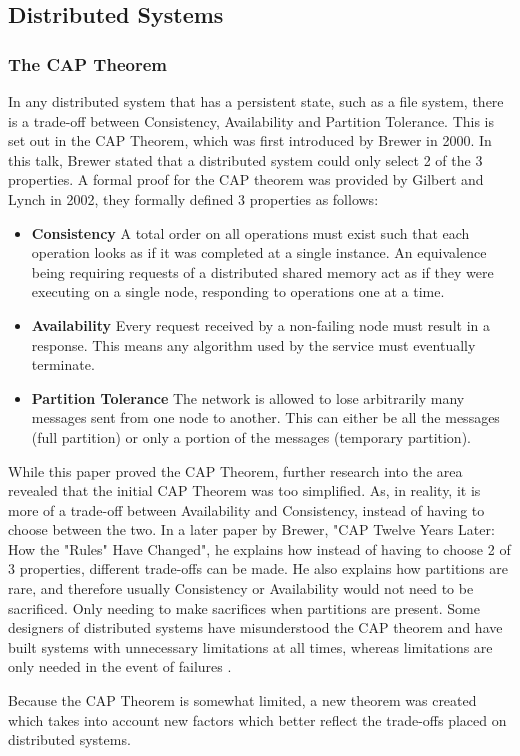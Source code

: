 \documentclass[12pt]{article}
\begin{document}
\subsection{Distributed Systems}
\subsubsection{The CAP Theorem}
In any distributed system that has a persistent state, such as a file system, there is a trade-off between Consistency, Availability and Partition Tolerance.
This is set out in the CAP Theorem, which was first introduced by Brewer in 2000\cite{CAPTheorem}. In this talk, Brewer stated that a distributed system could only select 2 of the 3 properties. A formal proof for the CAP theorem was provided by Gilbert and Lynch in 2002\cite{10.1145/564585.564601}, they formally defined 3 properties as follows:
\begin{itemize}
    \item \textbf{Consistency} A total order on all operations must exist such that each operation looks as if it was completed at a single instance. An equivalence being requiring requests of a distributed shared memory act as if they were executing on a single node, responding to operations one at a time.
    \item \textbf{Availability} Every request received by a non-failing node must result in a response.  This means any algorithm used by the service must eventually terminate.
    \item \textbf{Partition Tolerance} The network is allowed to lose arbitrarily many messages sent from one node to another. This can either be all the messages (full partition) or only a portion of the messages (temporary partition).
\end{itemize}
While this paper proved the CAP Theorem, further research into the area revealed that the initial CAP Theorem was too simplified. As, in reality, it is more of a trade-off between Availability and Consistency, instead of having to choose between the two. In a later paper by Brewer, "CAP Twelve Years Later: How the "Rules" Have Changed"\cite{6133253}, he explains how instead of having to choose 2 of 3 properties, different trade-offs can be made. He also explains how partitions are rare, and therefore usually Consistency or Availability would not need to be sacrificed. Only needing to make sacrifices when partitions are present. Some designers of distributed systems have misunderstood the CAP theorem and have built systems with unnecessary limitations at all times, whereas limitations are only needed in the event of failures \cite{6133253}. \par
Because the CAP Theorem is somewhat limited, a new theorem was created which takes into account new factors which better reflect the trade-offs placed on distributed systems.
\end{document}
